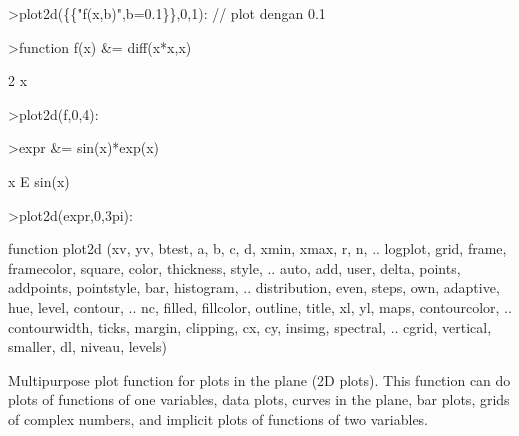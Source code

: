 \documentclass{article}
\begin{document}
\begin{eulernotebook}
\begin{eulercomment}
\begin{eulercomment}
\begin{eulercomment}
\begin{eulercomment}
\begin{eulercomment}
\begin{eulercomment}
\begin{eulerprompt}
>plot2d(\{\{"f(x,b)",b=0.1\}\},0,1): // plot dengan 0.1
\end{eulerprompt}
\begin{eulerprompt}
>function f(x) &= diff(x*x,x)
\end{eulerprompt}
\begin{euleroutput}
  
                                   2 x
  
\end{euleroutput}
\begin{eulerprompt}
>plot2d(f,0,4):
\end{eulerprompt}
\begin{eulerprompt}
>expr &= sin(x)*exp(x)
\end{eulerprompt}
\begin{euleroutput}
  
                                 x
                                E  sin(x)
  
\end{euleroutput}
\begin{eulerprompt}
>plot2d(expr,0,3pi):
\end{eulerprompt}
\begin{eulerudf}
  
\end{eulerudf}
\begin{eulercomment}
\end{eulercomment}
\begin{eulerttcomment}
  function plot2d (xv, yv, btest, a, b, c, d, xmin, xmax, r, n,  ..
  logplot, grid, frame, framecolor, square, color, thickness, style, ..
  auto, add, user, delta, points, addpoints, pointstyle, bar, histogram,  ..
  distribution, even, steps, own, adaptive, hue, level, contour,  ..
  nc, filled, fillcolor, outline, title, xl, yl, maps, contourcolor, ..
  contourwidth, ticks, margin, clipping, cx, cy, insimg, spectral,  ..
  cgrid, vertical, smaller, dl, niveau, levels)
\end{eulerttcomment}
\begin{eulercomment}
Multipurpose plot function for plots in the plane (2D plots). This function can do
plots of functions of one variables, data plots, curves in the plane, bar plots, grids
of complex numbers, and implicit plots of functions of two variables.


\end{eulercomment}
\end{eulercomment}
\end{eulercomment}
\end{eulercomment}
\end{eulercomment}
\end{eulercomment}
\end{eulercomment}
\end{eulernotebook}
\end{document}
